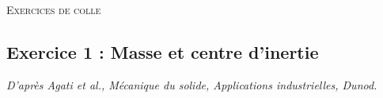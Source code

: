 \documentclass[10pt]{article}
\begin{document}

\begin{center}
\Large{\textsc{Exercices de colle}}
\end{center}

\vspace{.5cm}


\subsection*{Exercice 1 : Masse et centre d'inertie}
\begin{flushright}
\textit{D'après Agati et al., Mécanique du solide, Applications industrielles, Dunod.}
\end{flushright}
\setcounter{subparagraph}{0}
\end{document}
